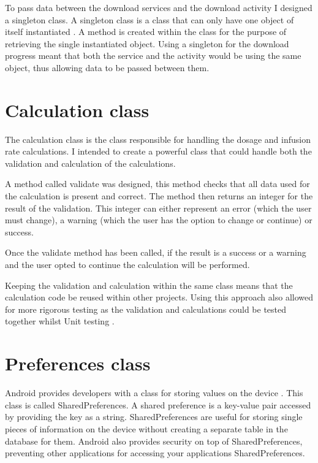 To pass data between the download services and the download activity I designed a singleton class. A singleton class is a class that can only have one object of itself instantiated \cite{singleton}. A method is created within the class for the purpose of retrieving the single instantiated object. Using a singleton for the download progress meant that both the service and the activity would be using the same object, thus allowing data to be passed between them.

\section{Calculation class}
The calculation class is the class responsible for handling the dosage and infusion rate calculations. I intended to create a powerful class that could handle both the validation and calculation of the calculations.

A method called validate was designed, this method checks that all data used for the calculation is present and correct. The method then returns an integer for the result of the validation. This integer can either represent an error (which the user must change), a warning (which the user has the option to change or continue) or success.

Once the validate method has been called, if the result is a success or a warning and the user opted to continue the calculation will be performed.

Keeping the validation and calculation within the same class means that the calculation code be reused within other projects. Using this approach also allowed for more rigorous testing as the validation and calculations could be tested together whilst Unit testing \cite{junit}.

\section{Preferences class}

Android provides developers with a class for storing values on the device \cite{android}. This class is called SharedPreferences. A shared preference \cite{shared_pref} is a key-value pair accessed by providing the key as a string. SharedPreferences are useful for storing single pieces of information on the device without creating a separate table in the database for them\cite{shared_pref}. Android also provides security on top of SharedPreferences, preventing other applications for accessing your applications SharedPreferences. 


